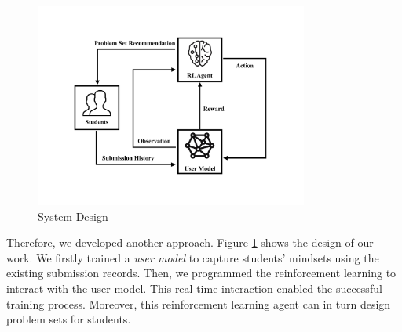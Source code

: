     \begin{figure}[!htp]
        \centering
        \includegraphics[width=0.8\textwidth]{img/system-design.pdf}
        \caption{System Design}
        \label{fig:system-design}
    \end{figure}

    Therefore, we developed another approach.
    Figure \ref{fig:system-design} shows the design of our work.
    We firstly trained a \emph{user model} to capture students' mindsets using the existing submission records.
    Then, we programmed the reinforcement learning to interact with the user model.
    This real-time interaction enabled the successful training process.
    Moreover, this reinforcement learning agent can in turn design problem sets for students.



















